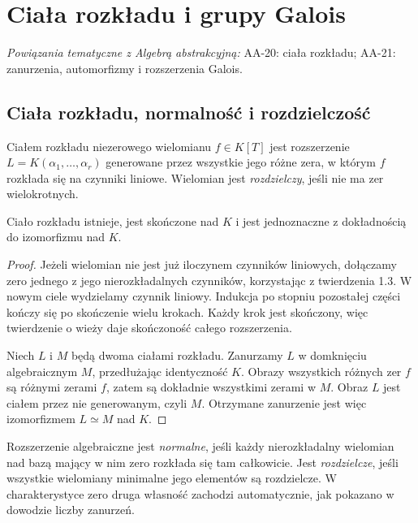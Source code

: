 \chapter{Ciała rozkładu i grupy Galois}

\providecommand{\atlasref}[2]{#2}
\noindent\emph{Powiązania tematyczne z Algebrą abstrakcyjną:} \atlasref{AA-20::aa:ch:field-extensions}{AA-20: ciała rozkładu}; \atlasref{AA-21::aa:ch:embeddings-normal-separable}{AA-21: zanurzenia, automorfizmy i rozszerzenia Galois}.


\section{Ciała rozkładu, normalność i rozdzielczość}

\begin{definicja}
Ciałem rozkładu niezerowego wielomianu $f\in K[T]$ jest rozszerzenie $L=K(\alpha_1,\dots,\alpha_r)$ generowane przez wszystkie jego różne zera, w którym $f$ rozkłada się na czynniki liniowe. Wielomian jest \emph{rozdzielczy}, jeśli nie ma zer wielokrotnych.
\end{definicja}

\begin{twierdzenie}
Ciało rozkładu istnieje, jest skończone nad $K$ i jest jednoznaczne z dokładnością do izomorfizmu nad $K$.
\end{twierdzenie}
\begin{proof}
Jeżeli wielomian nie jest już iloczynem czynników liniowych, dołączamy zero jednego z jego nierozkładalnych czynników, korzystając z twierdzenia 1.3. W nowym ciele wydzielamy czynnik liniowy. Indukcja po stopniu pozostałej części kończy się po skończenie wielu krokach. Każdy krok jest skończony, więc twierdzenie o wieży daje skończoność całego rozszerzenia.

Niech $L$ i $M$ będą dwoma ciałami rozkładu. Zanurzamy $L$ w domknięciu algebraicznym $M$, przedłużając identyczność $K$. Obrazy wszystkich różnych zer $f$ są różnymi zerami $f$, zatem są dokładnie wszystkimi zerami w $M$. Obraz $L$ jest ciałem przez nie generowanym, czyli $M$. Otrzymane zanurzenie jest więc izomorfizmem $L\simeq M$ nad $K$.
\end{proof}

Rozszerzenie algebraiczne jest \emph{normalne}, jeśli każdy nierozkładalny wielomian nad bazą mający w nim zero rozkłada się tam całkowicie. Jest \emph{rozdzielcze}, jeśli wszystkie wielomiany minimalne jego elementów są rozdzielcze. W charakterystyce zero druga własność zachodzi automatycznie, jak pokazano w dowodzie liczby zanurzeń.


